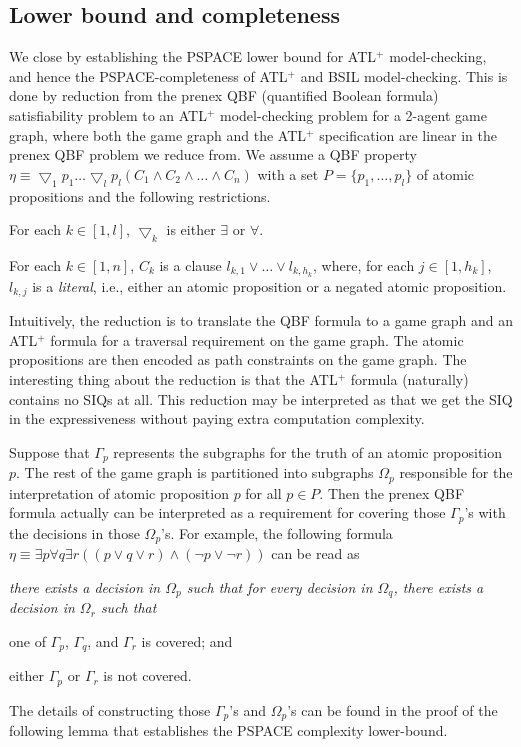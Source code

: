 \subsection{Lower bound and completeness \label{subsec.pspace.hard}}
We close by establishing the PSPACE lower bound for ATL$^+$ model-checking, and hence the PSPACE-completeness of ATL$^+$ and BSIL model-checking.
This is done by reduction from the prenex QBF (quantified Boolean formula) satisfiability problem
\cite{GJ79} to an ATL$^+$ model-checking problem for a 2-agent game graph, where both the game graph and the ATL$^+$ specification are linear in the prenex QBF problem we reduce from.
We assume a QBF property 
$\eta\equiv \bigtriangledown_1p_1\ldots \bigtriangledown_l p_l
(C_1\wedge C_2\wedge \ldots \wedge C_n)$ 
with a set $P=\{p_1,\ldots,p_l\}$  
of atomic propositions and the following restrictions.
\begin{list1}
\item For each $k\in[1,l]$, $\bigtriangledown_k$ is either $\exists$ or $\forall$.
\item For each $k\in [1,n]$, 
    $C_k$ is a clause $l_{k,1}\vee\ldots\vee l_{k,h_k}$, where,
    for each $j\in [1,h_k]$, $l_{k,j}$ is a {\em literal}, i.e., 
    either an atomic proposition or a negated atomic proposition.
\end{list1}
Intuitively, the reduction is to translate the QBF formula 
to a game graph 
and an ATL$^+$ formula for a traversal requirement on the game graph.  
The atomic propositions are then encoded as path constraints on the 
game graph.  
The interesting thing about the reduction is that the ATL$^+$ formula 
(naturally) contains no SIQs at all.  
This reduction may be interpreted as that we get the SIQ in the 
expressiveness without paying extra computation complexity. 

Suppose that $\Gamma_p$ represents the subgraphs for the truth of an 
atomic proposition $p$.  
The rest of the game graph is partitioned into subgraphs 
$\Omega_p$ responsible for the interpretation of atomic proposition $p$ 
for all $p\in P$.  
Then the prenex QBF formula actually can be interpreted as a requirement 
for covering those $\Gamma_p$'s with the decisions in those $\Omega_p$'s.  
For example, the following formula 
$\eta\equiv \exists p\forall q\exists r
((p\vee q \vee r)\wedge(\neg p \vee \neg r))$ 
can be read as {\em there exists a decision in $\Omega_p$ such that 
for every decision in $\Omega_q$, there exists 
a decision in $\Omega_r$ such that 
\begin{list1} 
\item one of $\Gamma_p$, $\Gamma_q$, and $\Gamma_r$ is covered; and  
\item either $\Gamma_{p}$ or $\Gamma_{r}$ is not covered. 
\end{list1} 
} 
\noindent 
The details of constructing those $\Gamma_p$'s and 
$\Omega_p$'s can be found in the proof of the following lemma 
that establishes the PSPACE complexity lower-bound. 

